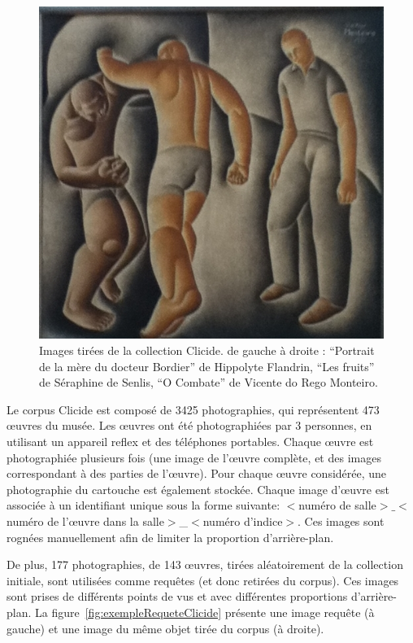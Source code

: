 \begin{figure}[htb]
\begin{minipage}[c]{.3\linewidth}
   \end{minipage} \hfill
   \begin{minipage}[c]{.3\linewidth}
      \includegraphics[width=\linewidth]{figures/35G-4.JPG}
   \end{minipage} \hfill
    \caption{Images tirées de la collection Clicide. de gauche à droite : ``Portrait de la mère du docteur Bordier'' de Hippolyte Flandrin, ``Les fruits'' de Séraphine de Senlis, ``O Combate'' de Vicente do Rego Monteiro. }
    \label{fig:exempleClicide}
\end{figure}

Le corpus Clicide est composé de 3425 photographies, qui représentent 473 œuvres du musée. Les œuvres ont été photographiées par 3 personnes, en utilisant un appareil reflex et des téléphones portables. Chaque œuvre est photographiée plusieurs fois (une image de l'œuvre complète, et des images correspondant à des parties de l'œuvre). Pour chaque œuvre considérée, une photographie du cartouche est également stockée. Chaque image d'œuvre est associée à un identifiant unique sous la forme suivante: $<$numéro de salle$>$$\_$$<$numéro de l'œuvre dans la salle$>$\_$<$numéro d'indice$>$. Ces images sont rognées manuellement afin de limiter la proportion d'arrière-plan.

De plus, 177 photographies, de 143 œuvres, tirées aléatoirement de la collection initiale, sont utilisées comme requêtes (et donc retirées du corpus). Ces images sont prises de différents points de vus et avec différentes proportions d'arrière-plan.
La figure~\ref{fig:exempleRequeteClicide} présente une image requête (à gauche) et une image du même objet tirée du corpus (à droite).


